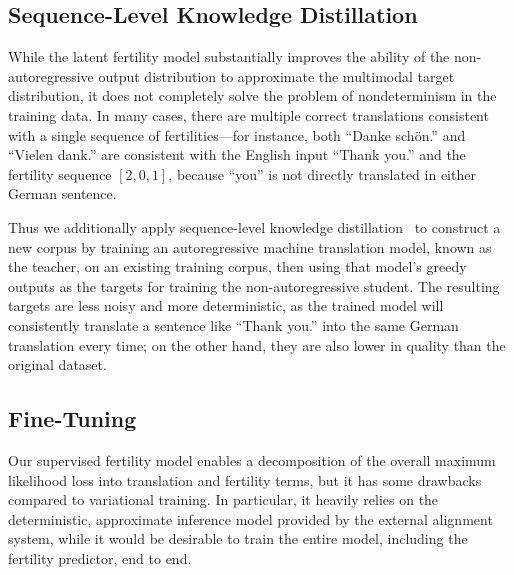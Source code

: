 \subsection{Sequence-Level Knowledge Distillation}\label{cp8.sec.seqkd}

While the latent fertility model substantially improves the ability of the non-autoregressive output distribution to approximate the multimodal target distribution, it does not completely solve the problem of nondeterminism in the training data. In many cases, there are multiple correct translations consistent with a single sequence of fertilities---for instance, both ``Danke sch\"{o}n.'' and ``Vielen dank.'' are consistent with the English input ``Thank you.'' and the fertility sequence $[2, 0, 1]$, because ``you'' is not directly translated in either German sentence.

Thus we additionally apply sequence-level knowledge distillation~\citep{kim2016sequence} to construct a new corpus by training an autoregressive machine translation model, known as the teacher, on an existing training corpus, then using that model's greedy outputs as the targets for training the non-autoregressive student. The resulting targets are less noisy and more deterministic, as the trained model will consistently translate a sentence like ``Thank you.'' into the same German translation every time; on the other hand, they are also lower in quality than the original dataset.


\subsection{Fine-Tuning}
Our supervised fertility model enables a decomposition of the overall maximum likelihood loss into translation and fertility terms, but it has some drawbacks compared to variational training.
In particular, it heavily relies on the deterministic, approximate inference model provided by the external alignment system, while it would be desirable to train the entire model, including the fertility predictor, end to end.

